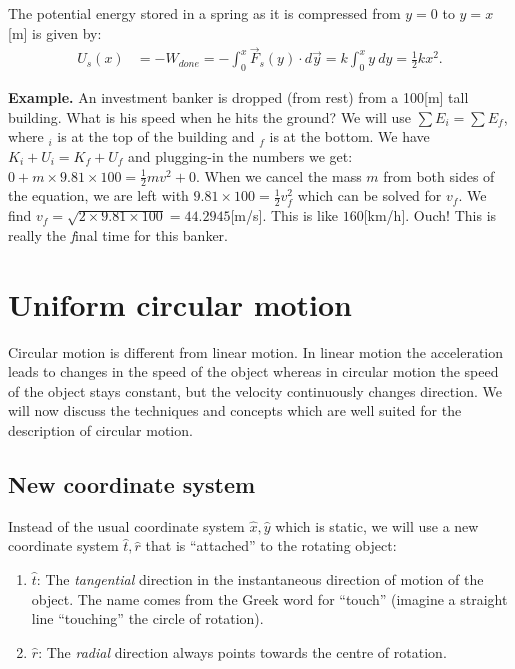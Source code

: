 \documentclass[letterpaper,9pt,journal]{IEEEtran}
\begin{document}
The potential energy stored in a spring as it is
compressed from $y=0$ to $y=x$[m] is given by:
\begin{align}
 U_s(x) &= -W_{done} = -\!\int_0^x \!\vec{F}_{s}(y) \cdot d\vec{y} = k\!\int_0^x \!\! y\: dy  = \frac{1}{2}kx^2.
  \label{SPRINGpotENERGY}
\end{align}


{\bf Example.}
An investment banker is dropped (from rest) from a 100[m] tall building.
What is his speed when he hits the ground?
We will use $\sum E_i  =  \sum E_f$, where $_i$ is at the top of the building
and $_f$ is at the bottom. We have $K_i + U_i   =    K_f + U_f$ and
plugging-in the numbers we get: $ 0      +  m \times9.81 \times100  =    \frac{1}{2}mv^2   + 0$.
When we cancel the mass $m$ from both sides of the equation, 
we are left with $9.81\times 100  =    \frac{1}{2}v_f^2$
which can be solved for $v_f$. 
We find $v_f =\sqrt{ 2\times 9.81\times 100}=44.2945$[m/s].
This is like $160$[km/h]. Ouch! This is really the \emph{f}inal time for this banker.









\section{Uniform circular motion}
\label{sec:uniform-circular-motion}

Circular motion is different from linear motion. 
In linear motion the acceleration leads to changes in the speed of the object
whereas in circular motion the speed of the object stays constant, 
but the velocity continuously changes direction.
We will now discuss the techniques and concepts which are well suited
for the description of circular motion.

\vspace{-3mm}
\subsection{New coordinate system}

Instead of the usual coordinate system $\hat{x},\hat{y}$ which is static, 
we will use a new coordinate system $\hat{t},\hat{r}$ that is ``attached'' to the rotating object:
\begin{enumerate}
\item  $\hat{t}$: 
	The \emph{tangential} direction in the instantaneous direction of motion of the object. 
	The name comes from the Greek word for ``touch'' (imagine a straight line ``touching'' the circle of rotation).
\item  $\hat{r}$: 
	The \emph{radial} direction always points towards the centre of rotation.
\end{enumerate}
%
\end{document}
